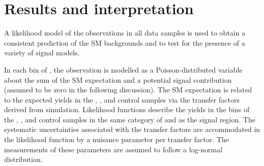 \section{Results and interpretation}
\label{sec:interpretation}
%
A likelihood model of the observations in all data samples is
used to obtain a consistent prediction of the SM backgrounds and to
test for the presence of a variety of signal models.%


In each bin of \scalht, the observation is modelled as a
Poisson-distributed variable about the sum of the SM expectation and a
potential signal contribution (assumed to be zero in the following
discussion).%
The SM expectation is related to the expected yields in
the \mj, \mmj, and \gj control samples via the transfer factors
derived from simulation. Likelihood functions %
describe the yields in the \scalht bins
of the \mj, \mmj, and \gj control samples in the same category of
\njet and \nb as the signal region. %
The systematic uncertainties
associated with the transfer factors are accommodated in the
likelihood function by a nuisance parameter per transfer factor. The
measurements of these parameters are assumed to follow a log-normal
distribution.


